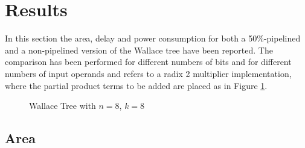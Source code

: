 
\section{Results}

In this section the area, delay and power consumption for both a 50\%-pipelined and a non-pipelined version of the Wallace tree have been reported. The comparison has been performed for different numbers of bits and for different numbers of input operands and refers to a radix 2 multiplier implementation, where  the partial product terms to be added are placed as in Figure \ref{fig:wallace_tree}.
\begin{figure}[H]
	\centering
	\hspace{1 cm}
	\textsf{{\fontsize{9pt}{5.5pt}
			}}
	\caption{Wallace Tree with $ n=8 $, $ k=8 $}
	\label{fig:wallace_tree}
\end{figure}


\subsection{Area}

